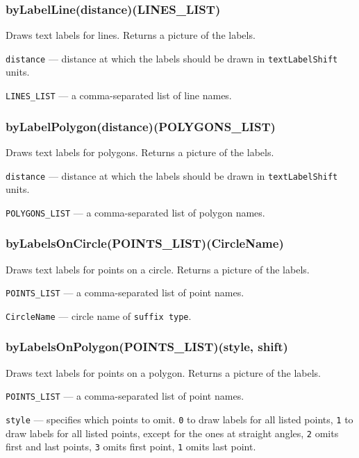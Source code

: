 \documentclass{ltxdoc}
\begin{document}
\subsubsection{byLabelLine(distance)(LINES\_LIST)}\label{byLabelLine}
	
	Draws text labels for lines. Returns a picture of the labels.
	
	\texttt{distance} — distance at which the labels should be drawn in \texttt{textLabelShift} units.
	
	\texttt{LINES\_LIST} — a comma-separated list of line names.

\subsubsection{byLabelPolygon(distance)(POLYGONS\_LIST)}\label{byLabelPolygon}
	
	Draws text labels for polygons. Returns a picture of the labels.
	
	\texttt{distance} — distance at which the labels should be drawn in \texttt{textLabelShift} units.
	
	\texttt{POLYGONS\_LIST} — a comma-separated list of polygon names.


\subsubsection{byLabelsOnCircle(POINTS\_LIST)(CircleName)}\label{byLabelsOnCircle}
	
	Draws text labels for points on a circle. Returns a picture of the labels.
	
	\texttt{POINTS\_LIST} — a comma-separated list of point names.
	
	\texttt{CircleName} — circle name of \texttt{suffix type}.

\subsubsection{byLabelsOnPolygon(POINTS\_LIST)(style, shift)}\label{byLabelsOnPolygon}
	
	Draws text labels for points on a polygon. Returns a picture of the labels.
	
	\texttt{POINTS\_LIST} — a comma-separated list of point names.
	
	\texttt{style} — specifies which points to omit. \texttt{0} to draw labels for all listed points, \texttt{1} to draw labels for all listed points, except for the ones at straight angles, \texttt{2} omits first and last points, \texttt{3} omits first point, \texttt{1} omits last point.
	
\end{document}
